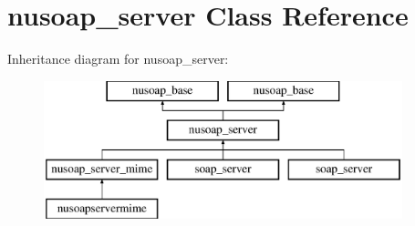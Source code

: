 \hypertarget{classnusoap__server}{}\section{nusoap\+\_\+server Class Reference}
\label{classnusoap__server}
Inheritance diagram for nusoap\+\_\+server\+:\begin{figure}[H]
\begin{center}
\leavevmode
\includegraphics[height=4.000000cm]{classnusoap__server}
\end{center}
\end{figure}
